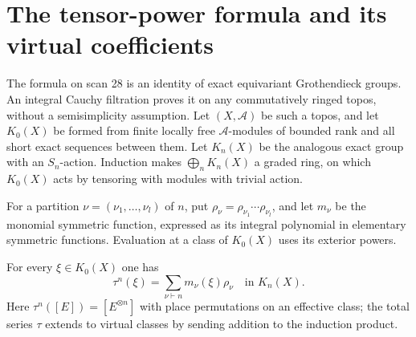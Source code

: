 \section{The tensor-power formula and its virtual coefficients}

The formula on scan 28 is an identity of exact equivariant
Grothendieck groups.  An integral Cauchy filtration proves it on any
commutatively ringed topos, without a semisimplicity assumption.
Let $(X,\mathcal A)$ be such a topos, and let $K_0(X)$ be formed
from finite locally free $\mathcal A$-modules of bounded rank and
all short exact sequences between them.  Let $K_n(X)$ be the
analogous exact group with an $S_n$-action.  Induction makes
$\bigoplus_nK_n(X)$ a graded ring, on which $K_0(X)$ acts by
tensoring with modules with trivial action.

For a partition $\nu=(\nu_1,\ldots,\nu_l)$ of $n$, put
$\rho_\nu=\rho_{\nu_1}\cdots\rho_{\nu_l}$, and let $m_\nu$
be the monomial symmetric function, expressed as its integral
polynomial in elementary symmetric functions.  Evaluation at a
class of $K_0(X)$ uses its exterior powers.

\begin{theorem}\label{thm:tensor-formula}
For every $\xi\in K_0(X)$ one has
\[
 \tau^n(\xi)=\sum_{\nu\vdash n}m_\nu(\xi)\rho_\nu
 \quad\text{in }K_n(X).
\]
Here $\tau^n([E])=[E^{\otimes n}]$ with place permutations on
an effective class; the total series $\tau$ extends to virtual
classes by sending addition to the induction product.
\end{theorem}

